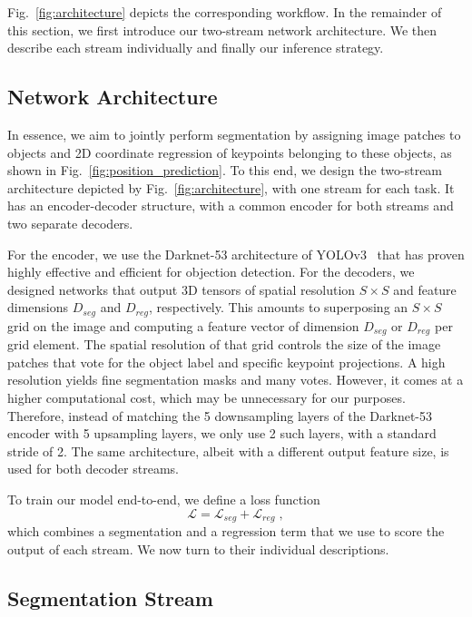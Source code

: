 \documentclass[10pt,twocolumn,letterpaper]{article}
\begin{document}
Fig.~\ref{fig:architecture} depicts the corresponding workflow.  In the remainder of this section, we first introduce our two-stream network architecture. We then describe each stream individually and finally our inference strategy.

\subsection{Network Architecture}
\label{eq:network}

In essence, we aim to jointly perform segmentation by assigning image patches to objects and  2D coordinate regression of keypoints belonging to these objects, as shown in Fig.~\ref{fig:position_prediction}. To this end,  we design the two-stream architecture depicted by Fig.~\ref{fig:architecture}, with one stream for each task. It has an encoder-decoder structure, with a common encoder for both streams and two separate decoders. 

For the encoder, we use the  Darknet-53 architecture of YOLOv3~\cite{Redmon18} that has proven highly effective and efficient for objection detection. For the decoders, we designed networks that output 3D tensors of spatial resolution $S\times S$ and feature dimensions $D_{seg}$ and $D_{reg}$, respectively. This amounts to superposing an $S\times S$ grid on the image and computing a feature vector of dimension $D_{seg}$ or $D_{reg}$ per grid element. The spatial resolution of that grid controls the size of the image patches that vote for the object label and specific keypoint projections. A high resolution yields fine segmentation masks and many votes. However, it comes at a higher computational cost, which may be unnecessary for our purposes. Therefore, instead of matching the 5 downsampling layers of the Darknet-53 encoder with 5 upsampling layers, we only use 2 such layers, with a standard stride of 2. The same architecture, albeit with a different output feature size, is used for both decoder streams.

To train our model end-to-end, we define a loss function
\begin{equation}
{\mathcal L}={\mathcal L}_{seg} + {\mathcal L}_{reg}\;,
\label{eq:lossF}
\end{equation}
which combines a segmentation and a regression term that we use to score the output of each stream. We now turn to their individual descriptions.  

\subsection{Segmentation Stream}
\label{sec:seg}
\end{document}
